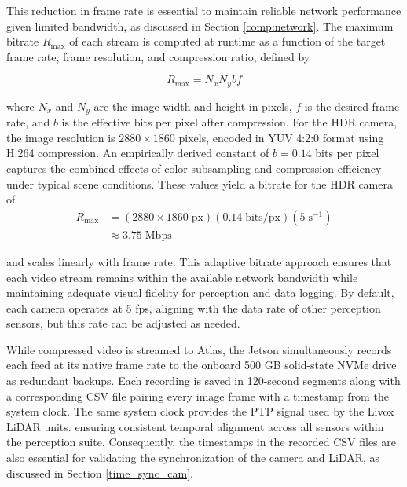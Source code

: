 \documentclass{erauthesis}
\begin{document}
This reduction in frame rate is essential to maintain reliable network performance given limited bandwidth, as discussed in Section \ref{comp:network}. 
The maximum bitrate $R_{\text{max}}$ of each stream is computed at runtime as a function of the target frame rate, frame resolution, and compression ratio, defined by

\begin{equation}
    R_{\text{max}} = N_x N_y b f
\end{equation}

where $N_x$ and $N_y$ are the image width and height in pixels, $f$ is the desired frame rate, and $b$ is the effective bits per pixel after compression.
For the HDR camera, the image resolution is $2880 \times 1860$ pixels, encoded in YUV 4:2:0 format using H.264 compression.
An empirically derived constant of $b = 0.14$ bits per pixel captures the combined effects of color subsampling and compression efficiency under typical scene conditions.
These values yield a bitrate for the HDR camera of
\begin{equation*}
    \begin{split}
        R_{\text{max}} & = (2880 \times 1860\; \text{px}) (0.14 \;\text{bits/px})(5\;\text{s}^{-1})  \\
        & \approx 3.75\; \text{Mbps}
    \end{split}
\end{equation*}

and scales linearly with frame rate.
This adaptive bitrate approach ensures that each video stream remains within the available network bandwidth while maintaining adequate visual fidelity for perception and data logging.
By default, each camera operates at 5 \ac{fps}, aligning with the data rate of other perception sensors, but this rate can be adjusted as needed. %



While compressed video is streamed to Atlas, the Jetson simultaneously records each feed at its native frame rate to the onboard 500 GB solid-state NVMe drive as redundant backups. 
Each recording is saved in 120-second segments along with a corresponding \ac{CSV} file pairing every image frame with a timestamp from the system clock. 
The same system clock provides the \ac{PTP} signal used by the Livox LiDAR units. ensuring consistent temporal alignment across all sensors within the perception suite. 
Consequently, the timestamps in the recorded \ac{CSV} files are also essential for validating the synchronization of the camera and LiDAR, as discussed in Section \ref{time_sync_cam}.
\end{document}
